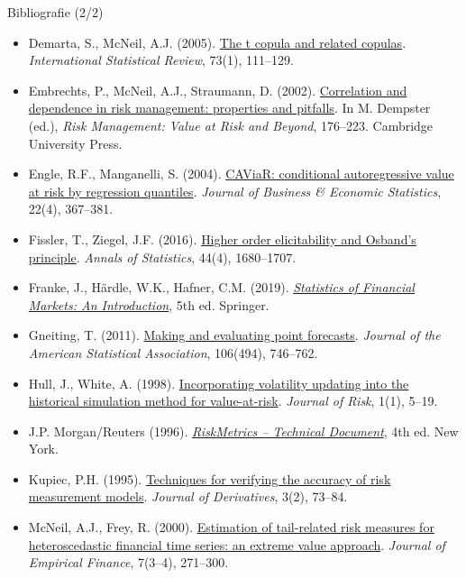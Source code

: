 \begin{frame}{Bibliografie (2/2)}
\itemsize{\tiny}
\begin{itemize}
    \item Demarta, S., McNeil, A.J. (2005). \href{https://doi.org/10.1111/j.1751-5823.2005.tb00254.x}{The t copula and related copulas}. \textit{International Statistical Review}, 73(1), 111--129.
    \item Embrechts, P., McNeil, A.J., Straumann, D. (2002). \href{https://doi.org/10.1017/CBO9780511615337.008}{Correlation and dependence in risk management: properties and pitfalls}. In M. Dempster (ed.), \textit{Risk Management: Value at Risk and Beyond}, 176--223. Cambridge University Press.
    \item Engle, R.F., Manganelli, S. (2004). \href{https://doi.org/10.1198/073500104000000370}{CAViaR: conditional autoregressive value at risk by regression quantiles}. \textit{Journal of Business \& Economic Statistics}, 22(4), 367--381.
    \item Fissler, T., Ziegel, J.F. (2016). \href{https://doi.org/10.1214/16-AOS1439}{Higher order elicitability and Osband's principle}. \textit{Annals of Statistics}, 44(4), 1680--1707.
    \item Franke, J., Härdle, W.K., Hafner, C.M. (2019). \href{https://doi.org/10.1007/978-3-030-13751-9}{\textit{Statistics of Financial Markets: An Introduction}}, 5th ed. Springer.
    \item Gneiting, T. (2011). \href{https://doi.org/10.1198/jasa.2011.r10138}{Making and evaluating point forecasts}. \textit{Journal of the American Statistical Association}, 106(494), 746--762.
    \item Hull, J., White, A. (1998). \href{https://doi.org/10.21314/JOR.1998.001}{Incorporating volatility updating into the historical simulation method for value-at-risk}. \textit{Journal of Risk}, 1(1), 5--19.
    \item J.P. Morgan/Reuters (1996). \href{https://www.msci.com/documents/10199/5915b101-4206-4ba0-aee2-3449d5c7e95a}{\textit{RiskMetrics -- Technical Document}}, 4th ed. New York.
    \item Kupiec, P.H. (1995). \href{https://doi.org/10.3905/jod.1995.407942}{Techniques for verifying the accuracy of risk measurement models}. \textit{Journal of Derivatives}, 3(2), 73--84.
    \item McNeil, A.J., Frey, R. (2000). \href{https://doi.org/10.1016/S0927-5398(00)00012-8}{Estimation of tail-related risk measures for heteroscedastic financial time series: an extreme value approach}. \textit{Journal of Empirical Finance}, 7(3--4), 271--300.

\end{itemize}
\end{frame}
